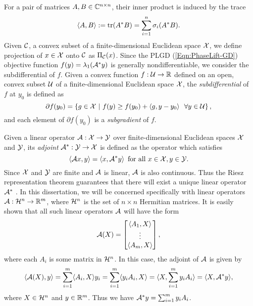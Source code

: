 For a pair of matrices $A, B \in {\mathbb C}^{n \times n}$, their inner product is induced by the trace
\begin{equation}			\label{Def:trace_inner_product}
\langle A, B \rangle := \mathrm{tr}(A^*B) = \sum_{i=1}^n \sigma_i(A^*B).
\end{equation}
Given ${\mathcal C}$, a convex subset of a finite-dimensional Euclidean space ${\mathcal X}$, we define projection of $x \in {\mathcal X}$ onto ${\mathcal C}$ as $\Pi_{\mathcal C}(x)$.  Since the PLGD (\ref{Eqn:PhaseLift-GD}) objective function $f(y) = \lambda_1({\mathcal A}^*y)$ is generally nondifferentiable, we consider the subdifferential of $f$.  Given a convex function $f : {\mathcal U} \rightarrow {\mathbb R}$ defined on an open, convex subset ${\mathcal U}$ of a finite-dimensional Euclidean space ${\mathcal X}$, the \textit{subdifferential} of $f$ at $y_0$ is defined as
\begin{equation}
	\label{Def:subdifferential}
	\partial f(y_0) = \left\{  g \in {\mathcal X} \ | \ f(y) \geq f(y_0) + \langle g, y - y_0 \rangle \ \ \forall y \in {\mathcal U}	\right\},
\end{equation}
and each element of $\partial f(y_0)$ is a \textit{subgradient} of $f$.

Given a linear operator ${\mathcal A} : {\mathcal X} \rightarrow {\mathcal Y}$ over finite-dimensional Euclidean spaces ${\mathcal X}$ and ${\mathcal Y}$, its \textit{adjoint} ${\mathcal A}^* : {\mathcal Y} \rightarrow {\mathcal X}$ is defined as the operator which satisfies 
\begin{equation}			\label{Def:adjoint_operator}
\langle {\mathcal A} x, y \rangle = \langle x, {\mathcal A}^* y \rangle \hspace{5pt} \text{for all } x \in {\mathcal X}, y \in {\mathcal Y}. 
\end{equation} 
Since ${\mathcal X}$ and ${\mathcal Y}$ are finite and ${\mathcal A}$ is linear, ${\mathcal A}$ is also continuous.  Thus the Riesz representation theorem guarantees that there will exist a unique linear operator ${\mathcal A}^*$ \cite[Section 6.2]{reed1980functional}.  In this dissertation, we will be concerned specifically with linear operators ${\mathcal A}: {\mathcal H}^n \rightarrow {\mathbb R}^m$, where ${\mathcal H}^n$ is the set of $n \times n$ Hermitian matrices.  It is easily shown that all such linear operators ${\mathcal A}$ will have the form
\begin{equation}
{\mathcal A}(X) = \begin{bmatrix}
\langle A_1, X \rangle	\\
\vdots	\\
\langle A_m, X \rangle
\end{bmatrix},
\end{equation}
where each $A_i$ is some matrix in ${\mathcal H}^n$.  In this case, the adjoint of ${\mathcal A}$ is given by 
\begin{equation}
\langle {\mathcal A}(X), y \rangle  	= \sum_{i=1}^m \langle A_i, X \rangle y_i	  = \sum_{i=1}^m \langle y_iA_i, X \rangle   = \langle X, \sum_{i=1}^m  y_iA_i \rangle = \langle X, {\mathcal A}^*y \rangle,
\end{equation}
where $X \in {\mathcal H}^n$ and $y \in {\mathbb R}^m$.
Thus we have ${\mathcal A}^*y = \sum_{i=1}^m  y_iA_i$.


